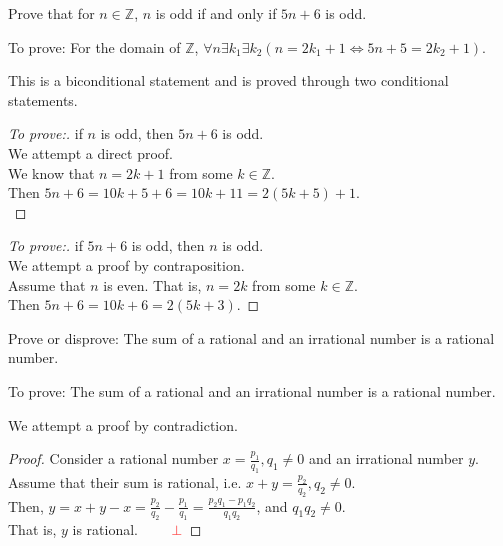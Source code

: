 \documentclass[a4paper]{exam}
\theoremstyle{definition}
\newcommand\Z{\ensuremath{\mathbb{Z}}}
\begin{document}
\begin{questions}

\question Prove that for $n\in\Z$, $n$ is odd if and only if $5n + 6$ is odd.

  \begin{solution}
    To prove: For the domain of $\Z$, $\forall n\exists k_1\exists k_2(n=2k_1+1\iff 5n+5=2k_2+1)$.
    
    This is a biconditional statement and is proved through two conditional statements.

    \begin{proof}[To prove:] if $n$ is odd, then $5n+6$ is odd.\\
      We attempt a direct proof.\\
      We know that $n=2k+1$ from some $k\in\Z$.\\
      Then $5n+6=10k+5+6=10k+11=2(5k+5)+1$.\\
    \end{proof}
    \begin{proof}[To prove:] if $5n+6$ is odd, then $n$ is odd.\\
      We attempt a proof by contraposition.\\
      Assume that $n$ is even. That is, $n=2k$ from some $k\in\Z$.\\
      Then $5n+6=10k+6=2(5k+3)$.
    \end{proof}
  \end{solution}

\question Prove or disprove: The sum of a rational and an irrational number is a rational number.

  \begin{solution}
    To prove: The sum of a rational and an irrational number is a rational number.

      We attempt a proof by contradiction.

      \begin{proof}
        Consider a rational number $x =\frac{p_1}{q_1}, q_1\neq 0$ and an irrational number $y$.\\
        Assume that their sum is rational, i.e. $x+y=\frac{p_2}{q_2}, q_2\neq 0$.\\
        Then, $y = x+y - x = \frac{p_2}{q_2} - \frac{p_1}{q_1} = \frac{p_2q_1-p_1q_2}{q_1q_2}$, and $q_1q_2\neq 0$.\\
        That is, $y$ is rational. $\qquad{\color{red}\bot}$
      \end{proof}
    \end{solution}
  

\end{questions}
\end{document}
